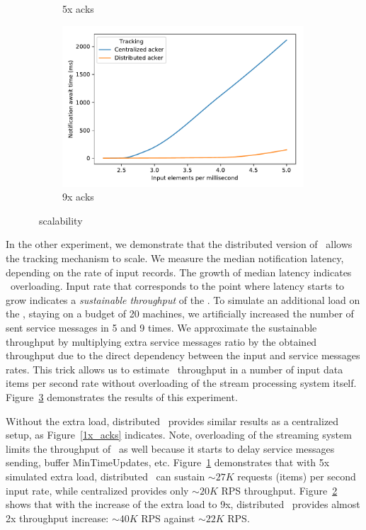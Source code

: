 \begin{figure}[t!]
\begin{subfigure}[b]{0.32\textwidth}
            \caption{5x acks}
            \label{5x_acks}
    \end{subfigure}
    \hspace{5mm}
    \begin{subfigure}[b]{0.32\textwidth}
            \includegraphics[width=0.99\textwidth]{pics/scalability_09x.pdf}
            \caption{9x acks}
            \label{9x_acks}
    \end{subfigure}
    \caption{\tracker\ scalability}
    \label{notification_scalability}
\end{figure}

In the other experiment, we demonstrate that the distributed version of \tracker\ allows the tracking mechanism to scale. We measure the median notification latency, depending on the rate of input records. The growth of median latency indicates \tracker\ overloading. Input rate that corresponds to the point where latency starts to grow indicates a {\em sustainable throughput} of the \tracker. To simulate an additional load on the \tracker, staying on a budget of 20 machines, we artificially increased the number of sent service messages in 5 and 9 times. We approximate the sustainable throughput by multiplying extra service messages ratio by the obtained throughput due to the direct dependency between the input and service messages rates. This trick allows us to estimate \tracker\ throughput in a number of input data items per second rate without overloading of the stream processing system itself. Figure~\ref{notification_scalability} demonstrates the results of this experiment.

Without the extra load, distributed \tracker\ provides similar results as a centralized setup, as Figure~\ref{1x_acks} indicates. Note, overloading of the streaming system limits the throughput of \tracker\ as well because it starts to delay service messages sending, buffer MinTimeUpdates, etc. Figure~\ref{5x_acks} demonstrates that with 5x simulated extra load, distributed \tracker\ can sustain $\sim 27K$ requests (items) per second input rate, while centralized provides only $\sim 20K$ RPS throughput. Figure~\ref{9x_acks} shows that with the increase of the extra load to 9x, distributed \tracker\ provides almost 2x throughput increase: $\sim 40K$ RPS against $\sim 22K$ RPS. 

